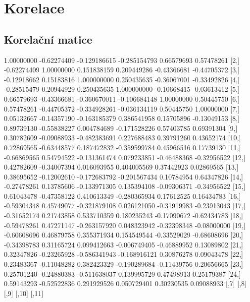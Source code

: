 \documentclass[a4paper]{ article}
\begin{document}
\section{Korelace}
\subsection{Korelační matice}
\begin{table}[H]

\begin{Schunk}
\begin{Soutput}
             [,1]        [,2]         [,3]         [,4]        [,5]        [,6]
 [1,]  1.00000000 -0.62274409 -0.129186615 -0.285154793  0.66579693  0.57478261
 [2,] -0.62274409  1.00000000  0.151838159  0.209449286 -0.43366681 -0.44705372
 [3,] -0.12918662  0.15183816  1.000000000  0.250435635 -0.36067001 -0.33492826
 [4,] -0.28515479  0.20944929  0.250435635  1.000000000 -0.10668415 -0.03613412
 [5,]  0.66579693 -0.43366681 -0.360670011 -0.106684148  1.00000000  0.50445750
 [6,]  0.57478261 -0.44705372 -0.334928261 -0.036134119  0.50445750  1.00000000
 [7,]  0.05132667 -0.14357190 -0.163185379  0.386541958  0.15705896 -0.13049153
 [8,]  0.89739130 -0.55838227  0.004784689 -0.171528226  0.57403785  0.69391304
 [9,]  0.30782609 -0.09088933 -0.482383691  0.227688483  0.39791260  0.43652174
[10,]  0.72869565 -0.63448577  0.187472832 -0.359599784  0.45966516  0.17739130
[11,] -0.66869565  0.54794522 -0.131361474  0.079233851 -0.46488368 -0.32956522
[12,]  0.42782609 -0.34007394  0.016093955  0.404005569  0.37442923  0.02869565
[13,]  0.38695652 -0.12002610 -0.172683792 -0.201567434  0.10784954  0.64347826
[14,] -0.27478261  0.13785606 -0.133971305  0.135394108 -0.09306371 -0.34956522
[15,]  0.61043478 -0.47358122  0.410613349 -0.280365934  0.17612525  0.16434783
[16,] -0.59304348  0.45749077 -0.321879108  0.026121050 -0.31919983 -0.23913043
[17,] -0.31652174  0.21743858  0.533710359  0.180235243 -0.17090672 -0.62434783
[18,] -0.59478261  0.47271147 -0.263157920  0.048323942 -0.32398348 -0.08000000
[19,] -0.60608696  0.46879758  0.355371934  0.154549544 -0.33529029 -0.68608696
[20,] -0.34398783  0.31165724  0.099412663 -0.006749405 -0.46889952  0.13089802
[21,]  0.32347826 -0.23265928 -0.586341943 -0.168916121  0.30876278  0.09043478
[22,]  0.23483367 -0.11048282  0.382423329 -0.190289684 -0.11439756  0.20656665
[23,]  0.25701240 -0.24880383 -0.511638037  0.139995729  0.47498913  0.25179387
[24,]  0.59143293 -0.52522836  0.291929526  0.050729401  0.30230535  0.09088933
             [,7]         [,8]          [,9]       [,10]        [,11]

\end{Soutput}
\end{Schunk}
\end{table}
\end{document}
